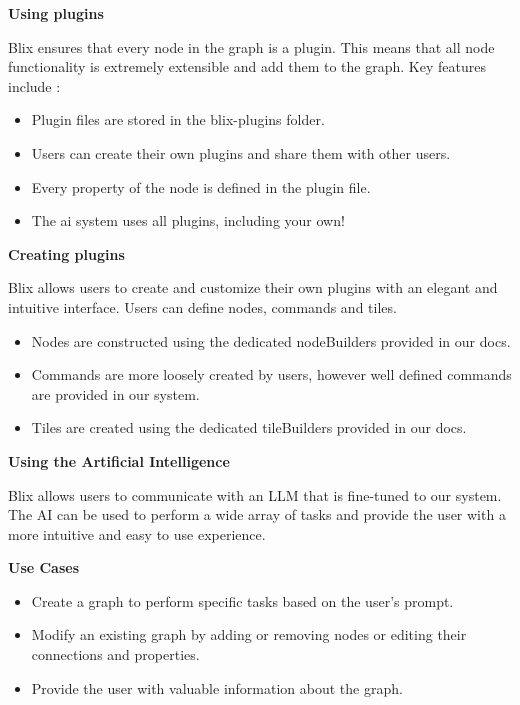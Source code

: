\documentclass[11pt,a4paper]{article}
\begin{document}
\textbf{Using plugins}

Blix ensures that every node in the graph is a plugin. This means that all node functionality is extremely extensible and add them to the graph. Key features include : 

\begin{itemize}
  \item[\textbullet] Plugin files are stored in the blix-plugins folder.
  \item[\textbullet] Users can create their own plugins and share them with other users.
  \item[\textbullet] Every property of the node is defined in the plugin file.
  \item[\textbullet] The ai system uses all plugins, including your own!
\end{itemize}

\textbf{Creating plugins}

Blix allows users to create and customize their own plugins with an elegant and intuitive interface. Users can define nodes, commands and tiles.

\begin{itemize}
  \item[\textbullet] Nodes are constructed using the dedicated nodeBuilders provided in our docs.
  \item[\textbullet] Commands are more loosely created by users, however well defined commands are provided in our system.
  \item[\textbullet] Tiles are created using the dedicated tileBuilders provided in our docs.
\end{itemize}

\textbf{Using the Artificial Intelligence}

Blix allows users to communicate with an LLM that is fine-tuned to our system. The AI can be used to perform a wide array of tasks and provide the user with a more intuitive and easy to use experience.


\textbf{Use Cases}

\begin{itemize}
  \item[\textbullet] Create a graph to perform  specific tasks based on the user's prompt.
  \item[\textbullet] Modify an existing graph by adding or removing nodes or editing their connections and properties.
  \item[\textbullet] Provide the user with valuable information about the graph.
\end{itemize}
\end{document}
